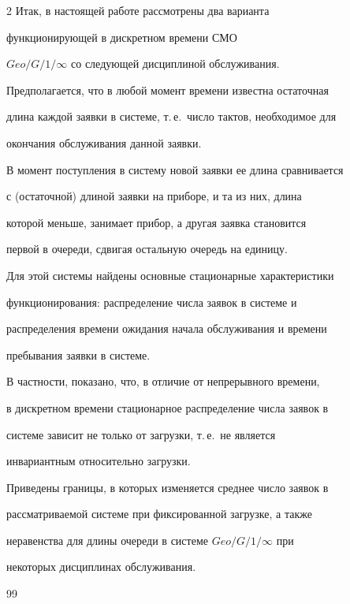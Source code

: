 \begin{multicols}{2}
Итак, в настоящей работе рассмотрены два варианта


функционирующей в дискретном времени СМО


$Geo/G/1/\infty$ со следующей дисциплиной обслуживания.


Предполагается, что в любой момент времени известна остаточная


длина каждой заявки в системе, т.\,е.\ число тактов, необходимое для


окончания обслуживания данной заявки.


В момент поступления в систему новой заявки ее длина сравнивается


с (остаточной) длиной заявки на приборе, и та из них, длина


которой меньше, занимает прибор, а другая заявка становится


первой в очереди, сдвигая остальную очередь на единицу.





Для этой системы найдены основные стационарные характеристики


функционирования: распределение числа заявок в системе и


распределения времени ожидания начала обслуживания и времени


пребывания заявки в системе.


В частности, показано, что, в отличие от непрерывного времени,


в дискретном времени стационарное распределение числа заявок в


системе зависит не только от загрузки, т.\,е.\ не является


инвариантным относительно загрузки.





Приведены границы, в которых изменяется среднее число заявок в


рассматриваемой системе при фиксированной загрузке, а также


неравенства для длины очереди в системе $Geo/G/1/\infty$ при


некоторых дисциплинах обслуживания.





{\small\frenchspacing


{%




\begin{thebibliography}{99}






\end{thebibliography}}}
\end{multicols}
